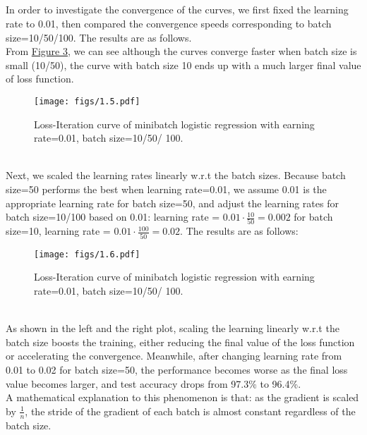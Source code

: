 \documentclass{article}
\begin{document}
        \subsection{}
        In order to investigate the convergence of the curves, we first fixed the learning rate to 0.01,
        then compared the convergence speeds corresponding to batch size=10/50/100. The results are as follows.\\
        From \hyperref[fig:1.5]{Figure 3}, we can see although the curves converge faster when batch size is small (10/50),
        the curve with batch size 10 ends up with a much larger final value of loss function. \\
        \begin{figure}[hbt!]
            \centering
            \texttt{[image: figs/1.5.pdf]}
            \caption{Loss-Iteration curve of minibatch logistic regression with earning rate=0.01,
            batch size=10/50/ 100.}
            \label{fig:1.5}
        \end{figure}\\
        Next, we scaled the learning rates linearly w.r.t the batch sizes. Because batch size=50 performs the best when learning rate=0.01,
        we assume 0.01 is the appropriate learning rate for batch size=50, and adjust the learning rates for batch size=10/100 based on 0.01:
        learning rate = $0.01\cdot\frac{10}{50}=0.002$ for batch size=10, learning rate = $0.01\cdot\frac{100}{50}=0.02$. The results are as follows:
        \begin{figure}[hbt!]
            \centering
            \texttt{[image: figs/1.6.pdf]}
            \caption{Loss-Iteration curve of minibatch logistic regression with earning rate=0.01,
            batch size=10/50/ 100.}
            \label{fig:1.6}
        \end{figure}\\
        As shown in the left and the right plot, scaling the learning linearly w.r.t the batch size boosts the training,
        either reducing the final value of the loss function or accelerating the convergence. 
        Meanwhile, after changing learning rate from 0.01 to 0.02 for batch size=50, 
        the performance becomes worse as the final loss value becomes larger, and test accuracy drops from 97.3\% to 96.4\%.\\
        A mathematical explanation to this phenomenon is that: as the gradient is scaled by $\frac{1}{n}$, 
        the stride of the gradient of each batch is almost constant regardless of the batch size. 
\end{document}
